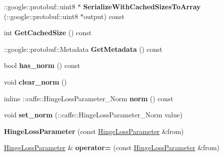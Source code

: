 \begin{DoxyCompactItemize}
\+::google\+::protobuf\+::uint8 $\ast$ {\bfseries Serialize\+With\+Cached\+Sizes\+To\+Array} (\+::google\+::protobuf\+::uint8 $\ast$output) const
\item 
\mbox{\label{classcaffe_1_1_hinge_loss_parameter_a7c81cb3d358362bc9d339256c4d57507}} 
int {\bfseries Get\+Cached\+Size} () const
\item 
\mbox{\label{classcaffe_1_1_hinge_loss_parameter_a04e2324c21fe244f2c5be72b35018fee}} 
\+::google\+::protobuf\+::\+Metadata {\bfseries Get\+Metadata} () const
\item 
\mbox{\label{classcaffe_1_1_hinge_loss_parameter_aae9a435db23621ab9f4c516955659b44}} 
bool {\bfseries has\+\_\+norm} () const
\item 
\mbox{\label{classcaffe_1_1_hinge_loss_parameter_af17dabc6c1747085890c12fd1517c690}} 
void {\bfseries clear\+\_\+norm} ()
\item 
\mbox{\label{classcaffe_1_1_hinge_loss_parameter_a793cf532295804f231ffe6cdff5935c6}} 
inline \+::caffe\+::\+Hinge\+Loss\+Parameter\+\_\+\+Norm {\bfseries norm} () const
\item 
\mbox{\label{classcaffe_1_1_hinge_loss_parameter_ac33092a2b8db6e0d6c9c66576a043447}} 
void {\bfseries set\+\_\+norm} (\+::caffe\+::\+Hinge\+Loss\+Parameter\+\_\+\+Norm value)
\item 
\mbox{\label{classcaffe_1_1_hinge_loss_parameter_a646c3a3a3c243625279565b49d13bbcc}} 
{\bfseries Hinge\+Loss\+Parameter} (const \mbox{\hyperlink{classcaffe_1_1_hinge_loss_parameter}{Hinge\+Loss\+Parameter}} \&from)
\item 
\mbox{\label{classcaffe_1_1_hinge_loss_parameter_a58bab973414f0c2b7247e3fcfe07defc}} 
\mbox{\hyperlink{classcaffe_1_1_hinge_loss_parameter}{Hinge\+Loss\+Parameter}} \& {\bfseries operator=} (const \mbox{\hyperlink{classcaffe_1_1_hinge_loss_parameter}{Hinge\+Loss\+Parameter}} \&from)
\item 

\end{DoxyCompactItemize}
